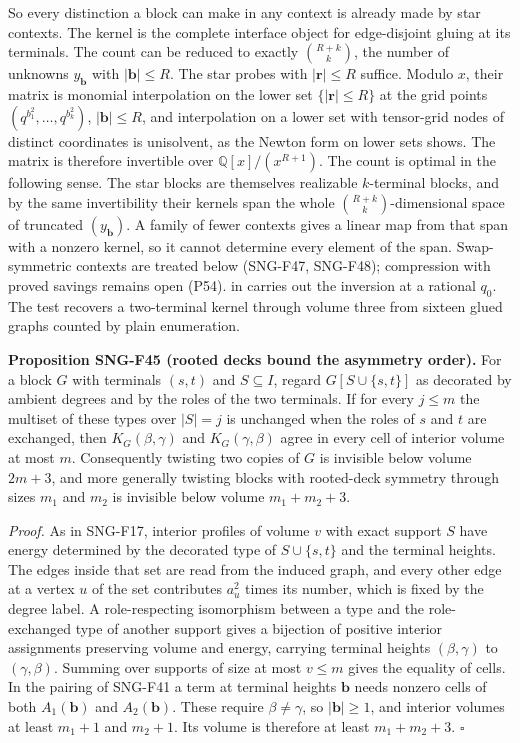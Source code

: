 \documentclass[
  11pt,
  a4paper,
]{report}
\let\singularitytexttt\texttt
\renewcommand{\texttt}[1]{\singularitytexttt{\seqsplit{#1}}}
\begin{document}
So every distinction a block can make in any context is already made by
star contexts. The kernel is the complete interface object for
edge-disjoint gluing at its terminals. The count can be reduced to
exactly \(\binom{R+k}{k}\), the number of unknowns \(y_{\mathbf b}\)
with \(|\mathbf b|\le R\). The star probes with \(|\mathbf r|\le R\)
suffice. Modulo \(x\), their matrix is monomial interpolation on the
lower set \(\{|\mathbf r|\le R\}\) at the grid points
\((q^{b_1^2},\ldots,q^{b_k^2})\), \(|\mathbf b|\le R\), and
interpolation on a lower set with tensor-grid nodes of distinct
coordinates is unisolvent, as the Newton form on lower sets shows. The
matrix is therefore invertible over \(\mathbb Q[x]/(x^{R+1})\). The
count is optimal in the following sense. The star blocks are themselves
realizable \(k\)-terminal blocks, and by the same invertibility their
kernels span the whole \(\binom{R+k}{k}\)-dimensional space of truncated
\((y_{\mathbf b})\). A family of fewer contexts gives a linear map from
that span with a nonzero kernel, so it cannot determine every element of
the span. Swap-symmetric contexts are treated below (SNG-F47, SNG-F48);
compression with proved savings remains open (P54).
\texttt{recover\_kernel\_from\_probes} in
\texttt{src/singularity/terminals.py} carries out the inversion at a
rational \(q_0\). The test recovers a two-terminal kernel through volume
three from sixteen glued graphs counted by plain enumeration.

\textbf{Proposition SNG-F45 (rooted decks bound the asymmetry order).}
For a block \(G\) with terminals \((s,t)\) and \(S\subseteq I\), regard
\(G[S\cup\{s,t\}]\) as decorated by ambient degrees and by the roles of
the two terminals. If for every \(j\le m\) the multiset of these types
over \(|S|=j\) is unchanged when the roles of \(s\) and \(t\) are
exchanged, then \(K_G(\beta,\gamma)\) and \(K_G(\gamma,\beta)\) agree in
every cell of interior volume at most \(m\). Consequently twisting two
copies of \(G\) is invisible below volume \(2m+3\), and more generally
twisting blocks with rooted-deck symmetry through sizes \(m_1\) and
\(m_2\) is invisible below volume \(m_1+m_2+3\).

\emph{Proof.} As in SNG-F17, interior profiles of volume \(v\) with
exact support \(S\) have energy determined by the decorated type of
\(S\cup\{s,t\}\) and the terminal heights. The edges inside that set are
read from the induced graph, and every other edge at a vertex \(u\) of
the set contributes \(a_u^2\) times its number, which is fixed by the
degree label. A role-respecting isomorphism between a type and the
role-exchanged type of another support gives a bijection of positive
interior assignments preserving volume and energy, carrying terminal
heights \((\beta,\gamma)\) to \((\gamma,\beta)\). Summing over supports
of size at most \(v\le m\) gives the equality of cells. In the pairing
of SNG-F41 a term at terminal heights \(\mathbf b\) needs nonzero cells
of both \(A_1(\mathbf b)\) and \(A_2(\mathbf b)\). These require
\(\beta\ne\gamma\), so \(|\mathbf b|\ge1\), and interior volumes at
least \(m_1+1\) and \(m_2+1\). Its volume is therefore at least
\(m_1+m_2+3\). \(\square\)
\end{document}
